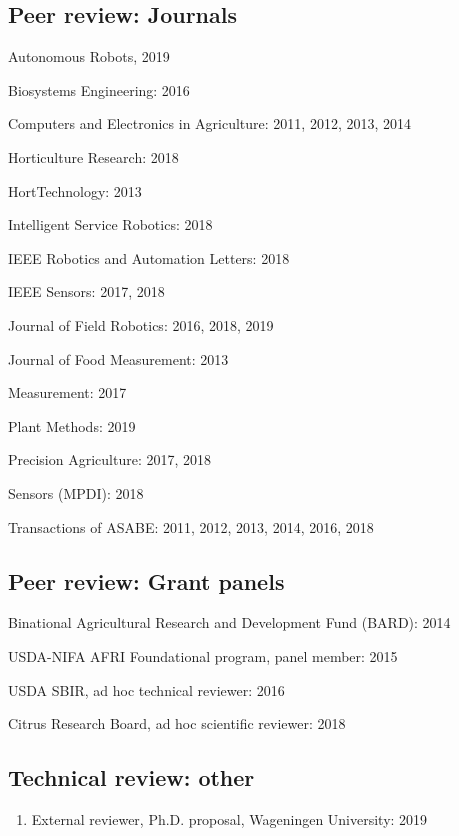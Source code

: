 \documentclass[letterpaper,11pt]{article}
\begin{document}
\subsection{Peer review: Journals}
\begin{enumerate}[noitemsep, leftmargin=*,label={[\arabic*]}]
\item{Autonomous Robots, 2019}
\item{Biosystems Engineering: 2016}
\item{Computers and Electronics in Agriculture: 2011, 2012, 2013, 2014}
\item{Horticulture Research: 2018}
\item{HortTechnology: 2013}
\item{Intelligent Service Robotics: 2018}
\item{IEEE Robotics and Automation Letters: 2018}
\item{IEEE Sensors: 2017, 2018}
\item{Journal of Field Robotics: 2016, 2018, 2019}
\item{Journal of Food Measurement: 2013}
\item{Measurement: 2017}
\item{Plant Methods: 2019}
\item{Precision Agriculture: 2017, 2018}
\item{Sensors (MPDI): 2018}
\item{Transactions of ASABE: 2011, 2012, 2013, 2014, 2016, 2018}
\end{enumerate}

\subsection{Peer review: Grant panels}
\begin{enumerate}[noitemsep, leftmargin=*,label={[\arabic*]}]
\item{Binational Agricultural Research and Development Fund (BARD): 2014}
\item{USDA-NIFA AFRI Foundational program, panel member: 2015}
\item{USDA SBIR, ad hoc technical reviewer: 2016}
\item{Citrus Research Board, ad hoc scientific reviewer: 2018}
\end{enumerate}

\subsection{Technical review: other}
\begin{enumerate}[noitemsep, leftmargin=*,label={}]
\item{External reviewer, Ph.D. proposal, Wageningen University: 2019}
\end{enumerate}
\end{document}
